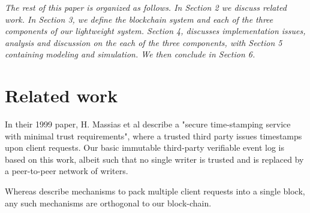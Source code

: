 \documentclass[10pt]{article}
\begin{document}
\emph{The rest of this paper is organized as follows. In Section 2 we discuss related work. In Section 3, we define the blockchain system and each of the three components of our lightweight system. Section 4, discusses implementation issues, analysis and discussion on the each of the three components, with Section 5 containing modeling and simulation. We then conclude in Section 6. } 








\section{Related work} 

In their 1999 paper, H. Massias et al \cite{massias} describe a "secure time-stamping service with minimal trust requirements", where a trusted third party issues timestamps upon client requests. Our basic immutable third-party verifiable event log is based on this work, albeit such that no single writer is trusted and is replaced by a peer-to-peer network of writers. 

Whereas \cite{massias, satoshi-paper} 
describe mechanisms to pack multiple client requests into a single block, any such mechanisms are orthogonal to our block-chain.
\end{document}
